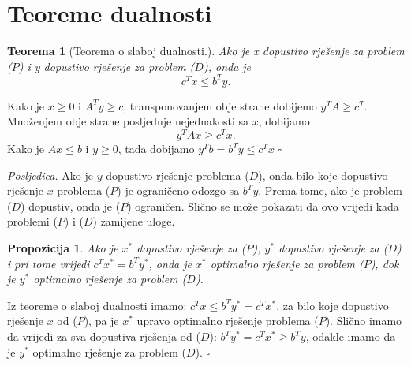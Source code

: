 \documentclass[a4paper, utf8, 11pt, colorlinks]{book}
\newtheorem{thm}{Teorema}
\newtheorem{prop}{Propozicija}
\newenvironment{proof}{{Dokaz:}}{\hfill$\square$}
\begin{document}
\section{Teoreme dualnosti}

\begin{thm}[Teorema o slaboj dualnosti.]
  Ako je x dopustivo rješenje za problem ($P$) i y dopustivo rješenje za problem  ($D$), onda je 
  $$ c^T x \leq b^T y.$$
\end{thm}
\begin{proof}
         Kako je $x \geq 0$ i $A^T y \geq c $,  transponovanjem obje strane dobijemo 
         $y^T A \geq c^T$. Množenjem obje strane posljednje nejednakosti sa $x$, dobijamo 
         $$y^TAx \geq c^T x.$$ Kako je $Ax \leq b$ i $y \geq 0$,  tada dobijamo 
         $ y^T b = b^T y  \leq c^T x$
\end{proof}

\emph{Posljedica.} Ako je $y$ dopustivo rješenje problema  ($D$),  onda bilo koje dopustivo rješenje $x$ problema ($P$) je ograničeno odozgo sa $b^T y$. Prema tome, ako je problem ($D$) dopustiv, onda je ($P$) ograničen. Slično se može pokazati da ovo vrijedi kada problemi ($P$) i ($D$) zamijene uloge.

\begin{prop}  
    Ako je $x^*$ dopustivo rješenje za  ($P$), $y^*$ dopustivo rješenje za ($D$) i pri tome vrijedi 
    $c^T x^* = b^T y^*$, onda je $x^*$ optimalno rješenje za problem  ($P$), dok je $y^*$ optimalno rješenje za problem  ($D$).  
\end{prop}
\begin{proof}
         Iz teoreme o slaboj dualnosti imamo: $c^T x  \leq b^T y^* = c^T x^*$, za bilo koje dopustivo rješenje $x$ od  ($P$), pa je $x^*$ upravo optimalno rješenje problema  ($P$).
         Slično imamo da vrijedi za sva dopustiva rješenja od  ($D$): $b^T y^* = c^T x^* \geq b^T y$, odakle imamo da je $y^*$ optimalno rješenje za problem  ($D$). 
\end{proof}
\end{document}
